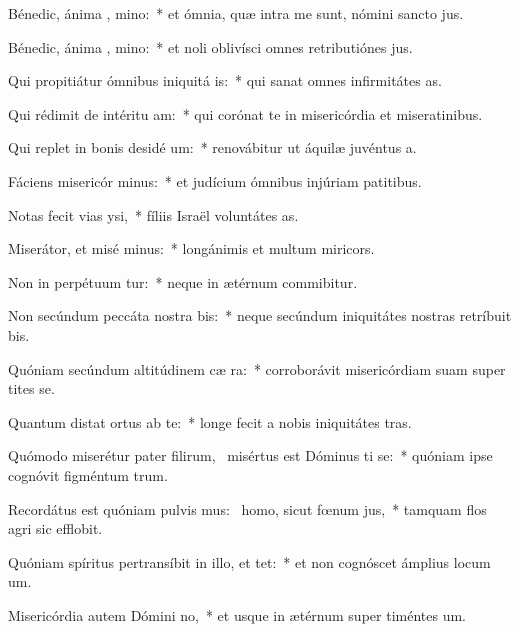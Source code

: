 \item Bénedic, ánima , mino:~* et ómnia, quæ intra me sunt, nómini sancto jus.
\item Bénedic, ánima , mino:~* et noli oblivísci omnes retributiónes jus.
\item Qui propitiátur ómnibus iniquitá is:~* qui sanat omnes infirmitátes as.
\item Qui rédimit de intéritu  am:~* qui corónat te in misericórdia et miseratinibus.
\item Qui replet in bonis desidé um:~* renovábitur ut áquilæ juvéntus a.
\item Fáciens misericór minus:~* et judícium ómnibus injúriam patitibus.
\item Notas fecit vias  ysi,~* fíliis Israël voluntátes as.
\item Miserátor, et misé minus:~* longánimis et multum miricors.
\item Non in perpétuum tur:~* neque in ætérnum commibitur.
\item Non secúndum peccáta nostra  bis:~* neque secúndum iniquitátes nostras retríbuit bis.
\item Quóniam secúndum altitúdinem cæ  ra:~* corroborávit misericórdiam suam super tites se.
\item Quantum distat ortus ab te:~* longe fecit a nobis iniquitátes tras.
\item Quómodo miserétur pater filirum,~\pscross{} misértus est Dóminus ti se:~* quóniam ipse cognóvit figméntum trum.
\item Recordátus est quóniam pulvis mus:~\pscross{} homo, sicut fœnum  jus,~* tamquam flos agri sic efflobit.
\item Quóniam spíritus pertransíbit in illo, et  tet:~* et non cognóscet ámplius locum um.
\item Misericórdia autem Dómini  no,~* et usque in ætérnum super timéntes um.
